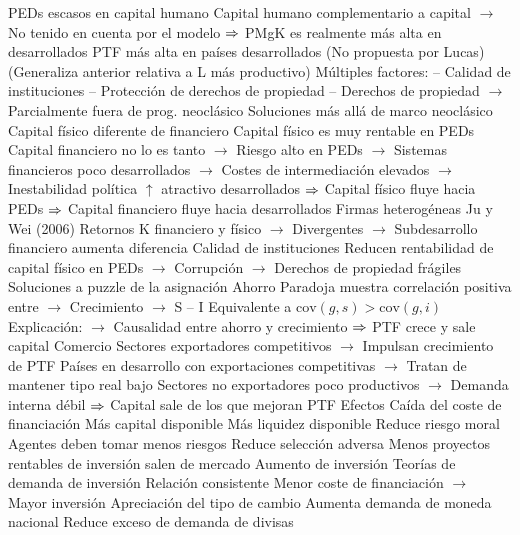 \documentclass{nuevotema}
\begin{document}
\begin{esquemal}
				\4[] PEDs escasos en capital humano
				\4[] Capital humano complementario a capital
				\4[] $\to$ No tenido en cuenta por el modelo
				\4[] $\Rightarrow$ PMgK es realmente más alta en desarrollados
				\4[iii] PTF más alta en países desarrollados
				\4[] (No propuesta por Lucas)
				\4[] (Generaliza anterior relativa a L más productivo)
				\4[] Múltiples factores:
				\4[] -- Calidad de instituciones
				\4[] -- Protección de derechos de propiedad
				\4[] -- Derechos de propiedad
				\4[] $\to$ Parcialmente fuera de prog. neoclásico
			\3 Soluciones más allá de marco neoclásico
				\4 Capital físico diferente de financiero
				\4[] Capital físico es muy rentable en PEDs
				\4[] Capital financiero no lo es tanto
				\4[] $\to$ Riesgo alto en PEDs
				\4[] $\to$ Sistemas financieros poco desarrollados
				\4[] $\to$ Costes de intermediación elevados
				\4[] $\to$ Inestabilidad política $\uparrow$ atractivo desarrollados
				\4[] $\Rightarrow$ Capital físico fluye hacia PEDs
				\4[] $\Rightarrow$ Capital financiero fluye hacia desarrollados
				\4 Firmas heterogéneas
				\4[] Ju y Wei (2006)
				\4[] Retornos K financiero y físico
				\4[] $\to$ Divergentes
				\4[] $\to$ Subdesarrollo financiero aumenta diferencia
				\4 Calidad de instituciones
				\4[] Reducen rentabilidad de capital físico en PEDs
				\4[] $\to$ Corrupción
				\4[] $\to$ Derechos de propiedad frágiles
			\3 Soluciones a puzzle de la asignación
				\4 Ahorro
				\4[] Paradoja muestra correlación positiva entre
				\4[] $\to$ Crecimiento
				\4[] $\to$ S -- I
				\4[] Equivalente a $\text{cov} (g,s) > \text{cov} (g,i)$
				\4[] Explicación:
				\4[] $\to$ Causalidad entre ahorro y crecimiento
				\4[] $\Rightarrow$ PTF crece y sale capital
				\4 Comercio
				\4[] Sectores exportadores competitivos
				\4[] $\to$ Impulsan crecimiento de PTF
				\4[] Países en desarrollo con exportaciones competitivas
				\4[] $\to$ Tratan de mantener tipo real bajo
				\4[] Sectores no exportadores poco productivos
				\4[] $\to$ Demanda interna débil
				\4[] $\Rightarrow$ Capital sale de los que mejoran PTF
		\2 Efectos
			\3 Caída del coste de financiación
				\4 Más capital disponible
				\4 Más liquidez disponible
				\4 Reduce riesgo moral
				\4[] Agentes deben tomar menos riesgos
				\4 Reduce selección adversa
				\4[] Menos proyectos rentables de inversión salen de mercado
			\3 Aumento de inversión
				\4 Teorías de demanda de inversión
				\4 Relación consistente
				\4[] Menor coste de financiación
				\4[] $\to$ Mayor inversión
			\3 Apreciación del tipo de cambio
				\4 Aumenta demanda de moneda nacional
				\4 Reduce exceso de demanda de divisas

\end{esquemal}
\end{document}
